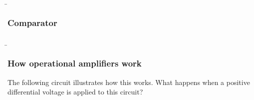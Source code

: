 \begin{frame}
\end{frame}

\begin{frame}
    \b{
    \frametitle{Comparator}
    \begin{figure}[H]
    \centering
    \begin{subfigure}[b]{\textwidth}
        \centering
        
    \end{subfigure}

    \begin{subfigure}[b]{\textwidth}
        \centering
        
    \end{subfigure}
    \label{fig:Komparator}
    \end{figure}
    }
\end{frame}

\begin{frame}
   \b{
    \frametitle{How operational amplifiers work}
    The following circuit illustrates how this works. What happens when a positive differential voltage is applied to this circuit?
    \begin{figure}[ht]
        \centering
    \end{figure}
   } 
\end{frame}

